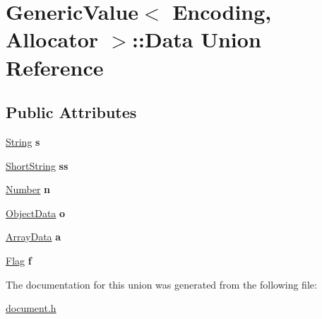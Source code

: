 \hypertarget{a00071}{}\section{Generic\+Value$<$ Encoding, Allocator $>$\+:\+:Data Union Reference}
\label{a00071}
\subsection*{Public Attributes}
\begin{DoxyCompactItemize}
\item 
\hyperlink{a00291}{String} {\bfseries s}\hypertarget{a00071_a6872a4b93763944063b425e6c001ed2b}{}\label{a00071_a6872a4b93763944063b425e6c001ed2b}

\item 
\hyperlink{a00273}{Short\+String} {\bfseries ss}\hypertarget{a00071_a410e39a5dc296eb3b152b54193740e4c}{}\label{a00071_a410e39a5dc296eb3b152b54193740e4c}

\item 
\hyperlink{a00226}{Number} {\bfseries n}\hypertarget{a00071_a243007cce2f4b75bea3e3c1ee4c3c239}{}\label{a00071_a243007cce2f4b75bea3e3c1ee4c3c239}

\item 
\hyperlink{a00227}{Object\+Data} {\bfseries o}\hypertarget{a00071_af6417eca530fba0d8bd65d309628eb11}{}\label{a00071_af6417eca530fba0d8bd65d309628eb11}

\item 
\hyperlink{a00037}{Array\+Data} {\bfseries a}\hypertarget{a00071_aeac31cf55bf5a024cead5ecb63e4fd48}{}\label{a00071_aeac31cf55bf5a024cead5ecb63e4fd48}

\item 
\hyperlink{a00104}{Flag} {\bfseries f}\hypertarget{a00071_ad8572112da083c775ce21bcbca96b2ab}{}\label{a00071_ad8572112da083c775ce21bcbca96b2ab}

\end{DoxyCompactItemize}


The documentation for this union was generated from the following file\+:\begin{DoxyCompactItemize}
\item 
\hyperlink{a00473}{document.\+h}\end{DoxyCompactItemize}
